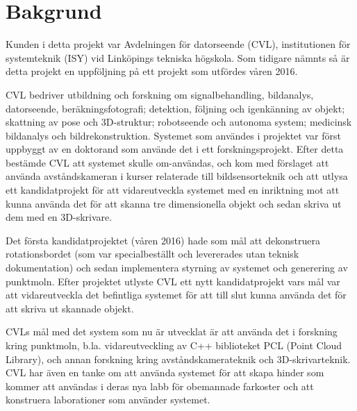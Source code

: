 \chapter{Bakgrund}
\label{cha:background}


Kunden i detta projekt var Avdelningen för datorseende (CVL), institutionen för systemteknik (ISY) vid Linköpings tekniska högskola. Som tidigare nämnts så är detta projekt en uppföljning på ett projekt som utfördes våren 2016.
 
CVL bedriver utbildning och forskning om signalbehandling, bildanalys, datorseende, beräkningsfotografi; detektion, följning och igenkänning av objekt; skattning av pose och 3D-struktur; robotseende och autonoma system; medicinsk bildanalys och bildrekonstruktion. Systemet som användes i projektet var först uppbyggt av en doktorand som använde det i ett forskningsprojekt. Efter detta bestämde CVL att systemet skulle om-användas, och kom med förslaget att använda avståndskameran i kurser relaterade till bildsensorteknik och att utlysa ett kandidatprojekt för att vidareutveckla systemet med en inriktning mot att kunna använda det för att skanna tre dimensionella objekt och sedan skriva ut dem med en 3D-skrivare. 

Det första kandidatprojektet (våren 2016) hade som mål att dekonstruera rotationsbordet (som var specialbeställt och levererades utan teknisk dokumentation) och sedan implementera styrning av systemet och generering av punktmoln. Efter projektet utlyste CVL ett nytt kandidatprojekt vars mål var att vidareutveckla det befintliga systemet för att till slut kunna använda det för att skriva ut skannade objekt.

CVLs mål med det system som nu är utvecklat är att använda det i forskning kring punktmoln, b.la. vidareutveckling av C++ biblioteket PCL (Point Cloud Library), och annan forskning kring avståndskamerateknik och 3D-skrivarteknik. CVL har även en tanke om att använda systemet för att skapa hinder som kommer att användas i deras nya labb för obemannade farkoster och att konstruera laborationer som använder systemet.

